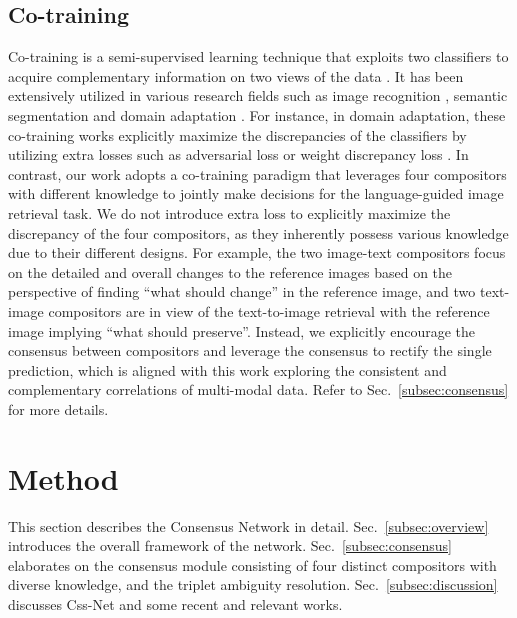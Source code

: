 \documentclass[sigconf]{acmart}
\begin{document}
\subsection{Co-training}
Co-training is a semi-supervised learning technique that exploits two classifiers to acquire complementary information on two views of the data \cite{blum1998combining}. It has been extensively utilized in various research fields such as image recognition \cite{qiao2018deep}, semantic segmentation \cite{peng2020deep} and domain adaptation \cite{saito2018maximum,zheng2019unsupervised,luo2019taking}. For instance, in domain adaptation, these co-training works explicitly maximize the discrepancies of the classifiers by utilizing extra losses such as adversarial loss \cite{saito2018maximum} or weight discrepancy loss \cite{luo2019taking}. In contrast, our work adopts a co-training paradigm that leverages four compositors with different knowledge to jointly make decisions for the language-guided image retrieval task. We do not introduce extra loss to explicitly maximize the discrepancy of the four compositors, as they inherently possess various knowledge due to their different designs. 
For example, the two image-text compositors focus on the detailed and overall changes to the reference images based on the perspective of finding ``what should change'' in the reference image, and two text-image compositors are in view of the text-to-image retrieval with the reference image implying ``what should preserve''. Instead, we explicitly encourage the consensus between compositors and leverage the consensus to rectify the single prediction, which is aligned with this work \cite{guan2021multimodal} exploring the consistent and complementary correlations of multi-modal data. 
Refer to Sec.~\ref{subsec:consensus} for more details.

\section{Method} \label{method}

This section describes the Consensus Network in detail. Sec.~\ref{subsec:overview} introduces the overall framework of the network. Sec.~\ref{subsec:consensus} elaborates on the consensus module consisting of four distinct compositors with diverse knowledge, and the triplet ambiguity resolution. Sec.~\ref{subsec:discussion} discusses Css-Net and some recent and relevant works.
\end{document}
